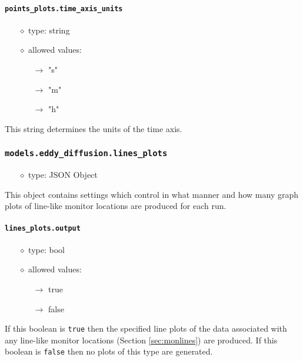 \documentclass[]{article}
\def\code#1{\texttt{#1}}
\begin{document}
\paragraph{\code{points\_plots.time\_axis\_units}}
\begin{itemize}
    \item[$\diamond$] type: string 
    \item[$\diamond$] allowed values:
    \begin{itemize}
        \item[$\rightarrow$] "s"
        \item[$\rightarrow$] "m"
        \item[$\rightarrow$] "h"
    \end{itemize}
\end{itemize}
This string determines the units of the time axis.

\subsubsection{\code{models.eddy\_diffusion.lines\_plots}}
\begin{itemize}
    \item[$\diamond$] type: JSON Object 
\end{itemize}
This object contains settings which control in what manner and how many graph
plots of line-like monitor locations are produced for each run. 

\paragraph{\code{lines\_plots.output}}
\begin{itemize}
    \item[$\diamond$] type: bool 
    \item[$\diamond$] allowed values:
    \begin{itemize}
        \item[$\rightarrow$] true
        \item[$\rightarrow$] false
    \end{itemize}
\end{itemize}
If this boolean is \code{true} then the specified line plots of the data
associated with any line-like monitor locations (Section \ref{sec:monlines}) are
produced.  If this boolean is \code{false} then no plots of this type are
generated.
\end{document}
